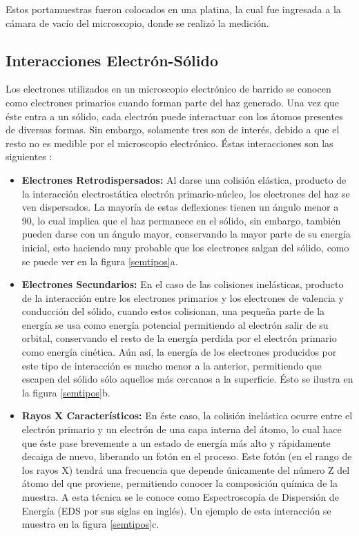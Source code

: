 \documentclass[../main.tex]{subfiles}
\begin{document}
Estos portamuestras fueron colocados en una platina, la cual fue ingresada a la cámara de vacío del microscopio, donde se realizó la medición. 

\subsection{Interacciones Electrón-Sólido}
Los electrones utilizados en un microscopio electrónico de barrido se conocen como electrones primarios cuando forman parte del haz generado. Una vez que éste entra a un sólido, cada electrón puede interactuar con los átomos presentes de diversas formas. Sin embargo, solamente tres son de interés, debido a que el resto no es medible por el microscopio electrónico. Éstas interacciones son las siguientes \cite{Egerton2005}:
\begin{itemize}
    \item  \textbf{Electrones Retrodispersados:} Al darse una colisión elástica, producto de la interacción electrostática electrón primario-núcleo, los electrones del haz se ven dispersados. La mayoría de estas deflexiones tienen un ángulo menor a 90\grado, lo cual implica que el haz permanece en el sólido, sin embargo, también pueden darse con un ángulo mayor, conservando la mayor parte de su energía inicial, esto haciendo muy probable que los electrones salgan del sólido, como se puede ver en la figura \ref{semtipos}a.
    \item \textbf{Electrones Secundarios:} En el caso de las colisiones inelásticas, producto de la interacción entre los electrones primarios y los electrones de valencia y conducción del sólido, cuando estos colisionan, una pequeña parte de la energía se usa como energía potencial permitiendo al electrón salir de su orbital, conservando el resto de la energía perdida por el electrón primario como energía cinética. Aún así, la energía de los electrones producidos por este tipo de interacción es mucho menor a la anterior, permitiendo que escapen del sólido sólo aquellos más cercanos a la superficie. Ésto se ilustra en la figura \ref{semtipos}b.
    \item \textbf{Rayos X Característicos:} En éste caso, la colisión inelástica ocurre entre el electrón primario y un electrón de una capa interna del átomo, lo cual hace que éste pase brevemente a un estado de energía más alto y rápidamente decaiga de nuevo, liberando un fotón en el proceso. Este fotón (en el rango de los rayos X) tendrá una frecuencia que depende únicamente del número Z del átomo del que proviene, permitiendo conocer la composición química de la muestra. A esta técnica se le conoce como Espectroscopía de Dispersión de Energía (EDS por sus siglas en inglés). Un ejemplo de esta interacción se muestra en la figura \ref{semtipos}c.
\end{itemize}
\end{document}
